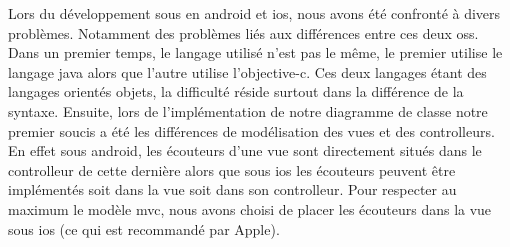 Lors du développement sous en \gls{android} et \gls{ios}, nous avons été
 confronté à divers problèmes.
Notamment des problèmes liés aux différences entre ces deux \glspl{os}.
Dans un premier temps, le langage utilisé n'est pas le même, le premier utilise
 le langage \gls{java} alors que l'autre utilise l'\gls{objective-c}.
 Ces deux langages étant des langages orientés objets, la difficulté réside
 surtout dans la différence de la syntaxe.
Ensuite, lors de l'implémentation de notre diagramme de classe notre premier
 soucis a été les différences de modélisation des vues et des controlleurs.
 En effet sous \gls{android}, les écouteurs d'une vue sont directement situés
 dans le controlleur de cette dernière alors que sous \gls{ios} les écouteurs
 peuvent être implémentés soit dans la vue soit dans son controlleur.
Pour respecter au maximum le modèle \gls{mvc}, nous avons choisi de placer les
écouteurs dans la vue sous \gls{ios} (ce qui est recommandé par Apple). 